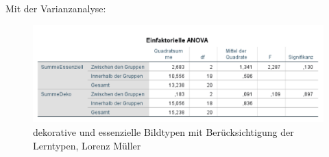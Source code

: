 Mit der Varianzanalyse:  

\begin{figure}[H]
\noindent\hspace{0.5mm}\includegraphics[width=15cm]{./Ressourcen/DekoEssGruppen.png}
\caption{dekorative und essenzielle Bildtypen mit Berücksichtigung der Lerntypen, Lorenz Müller}
\end{figure}

